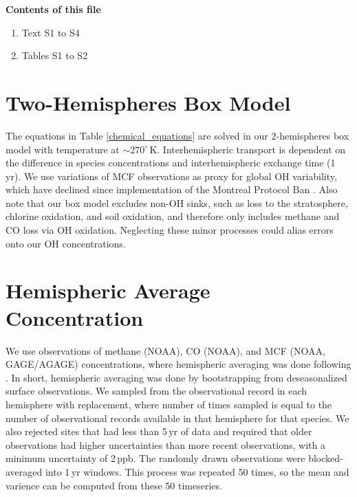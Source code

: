 \documentclass[grl]{agutexSI2019}
\begin{document}
%

\begin{article}

%
%



\noindent\textbf{Contents of this file}
\begin{enumerate}
\item Text S1 to S4
\item Tables S1 to S2
\end{enumerate}

\section{Two-Hemispheres Box Model}
The equations in Table \ref{chemical_equations} are solved in our 2-hemispheres box model with temperature at $\sim270^\circ$\,K. Interhemispheric transport is dependent on the difference in species concentrations and interhemispheric exchange time (1\,yr). We use variations of MCF observations as proxy for global OH variability, which have declined since implementation of the Montreal Protocol Ban \cite{montzka_small_2011, naus_constraints_2019}. Also note that our box model excludes non-OH sinks, such as loss to the stratosphere, chlorine oxidation, and soil oxidation, and therefore only includes methane and CO loss via OH oxidation. Neglecting these minor processes could alias errors onto our OH concentrations.

\section{Hemispheric Average Concentration} \label{Sec:A2}
We use observations of methane (NOAA), CO (NOAA), and MCF (NOAA, GAGE/AGAGE) concentrations, where hemispheric averaging was done following . In short, hemispheric averaging was done by bootstrapping from deseasonalized surface observations. We sampled from the observational record in each hemisphere with replacement, where number of times sampled is equal to the number of observational records available in that hemisphere for that species. We also rejected sites that had less than 5\,yr of data and required that older observations had higher uncertainties than more recent observations, with a minimum uncertainty of 2\,ppb. The randomly drawn observations were blocked-averaged into 1\,yr windows. This process was repeated 50 times, so the mean and varience can be computed from these 50 timeseries. 


\end{article}
\end{document}
